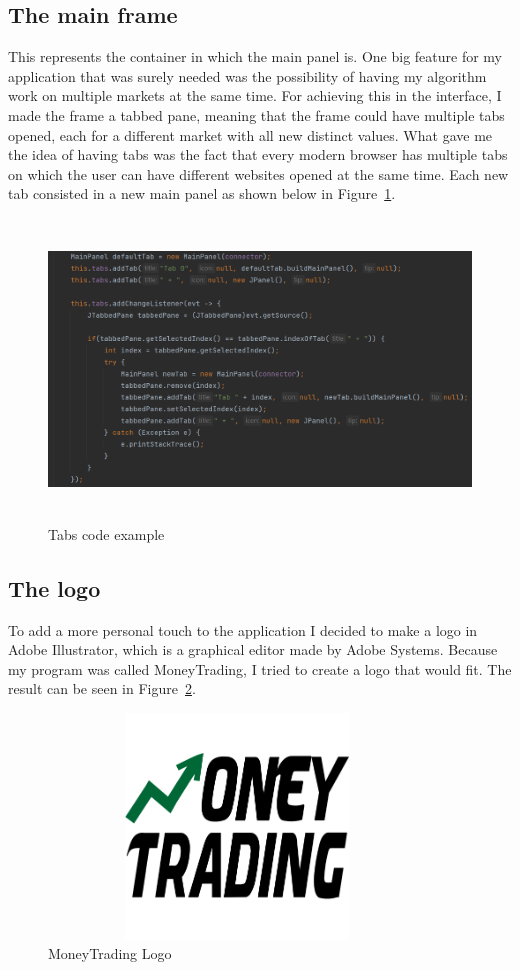 \documentclass[12pt,a4paper]{report}
\begin{document}
\subsection{The main frame}
This represents the container in which the main panel is. One big feature for my application that was surely needed was the possibility of having my algorithm work on multiple markets at the same time. For achieving this in the interface, I made the frame a tabbed pane, meaning that the frame could have multiple tabs opened, each for a different market with all new distinct values. What gave me the idea of having tabs was the fact that every modern browser has multiple tabs on which the user can have different websites opened at the same time. Each new tab consisted in a new main panel as shown below in Figure~\ref{fig:tabs}.
\begin{figure}[!ht]
	\centering
	\includegraphics[width=13cm,height=8cm]{pics/tabs.png}
	\caption{Tabs code example}
	\label{fig:tabs}
\end{figure}

\subsection{The logo}
To add a more personal touch to the application I decided to make a logo in Adobe Illustrator, which is a graphical editor made by Adobe Systems. Because my program was called MoneyTrading, I tried to create a logo that would fit. The result can be seen in Figure~\ref{fig:logo}.
\begin{figure}[!ht]
	\centering
	\includegraphics[width=10cm,height=6cm]{pics/logo.png}
	\caption{MoneyTrading Logo}
	\label{fig:logo}
\end{figure}
\end{document}
